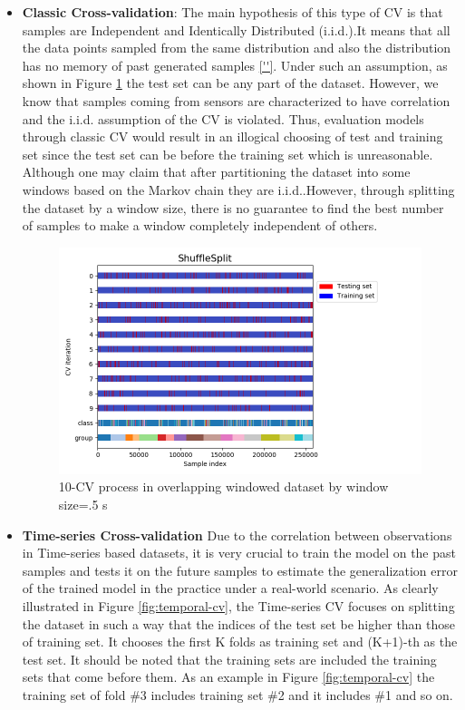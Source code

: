 \begin{itemize}
\item \textbf{Classic Cross-validation}: The main hypothesis of this type of CV is that samples are Independent and Identically Distributed (i.i.d.).It means that all the data points sampled from the same distribution and also the distribution has no memory of past generated samples \ref{''}. Under such an assumption, as shown in Figure \ref{fig:iid-cv} the test set can be any part of the dataset. However, we know that samples coming from sensors are characterized to have correlation and the i.i.d. assumption of the CV is violated. Thus, evaluation models through classic CV would result in an illogical choosing of test and training set since the test set can be before the training set which is unreasonable. Although one may claim that after partitioning the dataset into some windows based on the Markov chain \cite{gilks1995markov} they are i.i.d..However, through splitting the dataset by a window size, there is no guarantee to find the best number of samples to make a window completely independent of others. 

\begin{figure}[h]
    \centering
    \includegraphics[width=.5\textwidth]{Figures/ShuffleSplit.png}
    \caption{10-CV process in overlapping windowed dataset by window size=.5 s }
    \label{fig:iid-cv}
\end{figure}


\item \textbf{Time-series Cross-validation}
Due to the correlation between observations in Time-series based datasets, it is very crucial to train the model on the past samples and tests it on the future samples to estimate the generalization error of the trained model in the practice under a real-world scenario. As clearly illustrated in Figure \ref{fig:temporal-cv}, the Time-series CV focuses on splitting the dataset in such a way that the indices of the test set be higher than those of training set. It chooses the first K folds as training set and (K+1)-th as the test set. It should be noted that the training sets are included the training sets that come before them. As an example in Figure \ref{fig:temporal-cv} the training set of fold \#3 includes training set \#2 and it includes \#1 and so on.



\end{itemize}
